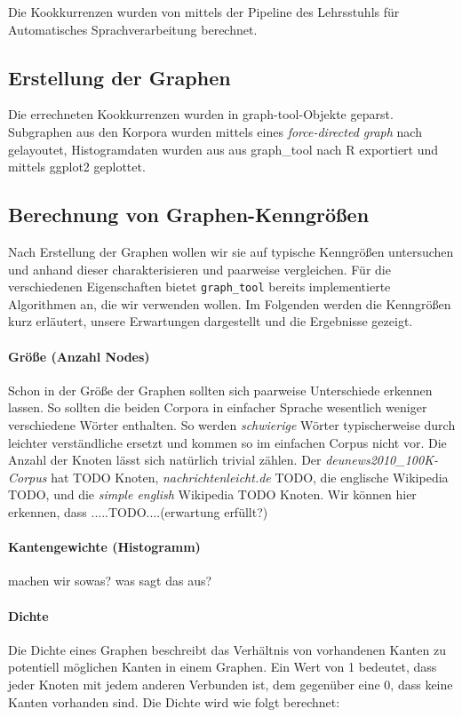 \documentclass[12pt, a4paper]{article}
\begin{document}
Die Kookkurrenzen wurden von mittels der Pipeline des Lehrsstuhls f\"ur
Automatisches Sprachverarbeitung berechnet.

\subsection{Erstellung der Graphen}

Die errechneten Kookkurrenzen wurden in graph-tool-Objekte geparst. Subgraphen
aus den Korpora wurden mittels eines \emph{force-directed graph} nach
\cite{Hu2005} gelayoutet, Histogramdaten wurden aus aus graph\_tool nach R
exportiert und mittels ggplot2 geplottet.

\subsection{Berechnung von Graphen-Kenngr\"o\ss{}en}

Nach Erstellung der Graphen wollen wir sie auf typische Kenngrößen untersuchen
und anhand dieser charakterisieren und paarweise vergleichen. Für die
verschiedenen Eigenschaften bietet \texttt{graph\_tool} bereits implementierte
Algorithmen an, die wir verwenden wollen. Im Folgenden werden die Kenngrößen
kurz erläutert, unsere Erwartungen dargestellt und die Ergebnisse gezeigt.

\paragraph{Gr\"o\ss{}e (Anzahl Nodes)}
Schon in der Größe der Graphen sollten sich paarweise Unterschiede erkennen
lassen. So sollten die beiden Corpora in einfacher Sprache wesentlich weniger
verschiedene Wörter enthalten. So werden \emph{schwierige} Wörter
typischerweise durch leichter verständliche ersetzt und kommen so im einfachen
Corpus nicht vor. Die Anzahl der Knoten lässt sich natürlich trivial zählen.
Der \emph{deunews2010\_100K-Corpus} hat TODO Knoten,
\emph{nachrichtenleicht.de} TODO, die englische Wikipedia TODO, und die
\emph{simple english} Wikipedia TODO Knoten. Wir können hier erkennen, dass
.....TODO....(erwartung erfüllt?)
 
\paragraph{Kantengewichte (Histogramm)}
machen wir sowas? was sagt das aus?

\paragraph{Dichte}
Die Dichte eines Graphen beschreibt das Verhältnis von vorhandenen Kanten zu
potentiell möglichen Kanten in einem Graphen. Ein Wert von 1 bedeutet, dass
jeder Knoten mit jedem anderen Verbunden ist, dem gegenüber eine 0, dass keine
Kanten vorhanden sind. Die Dichte wird wie folgt berechnet:
\end{document}
